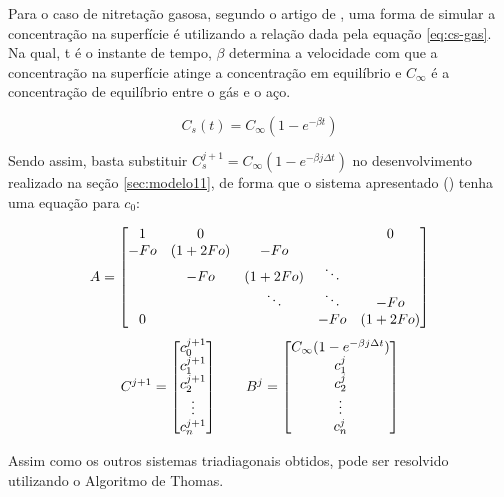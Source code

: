 Para o caso de nitretação gasosa, segundo o artigo de \cite{christiansen2008nitrogen}, uma forma de simular a concentração na superfície é utilizando a relação dada pela equação \autoref{eq:cs-gas}. Na qual, t é o instante de tempo, $\beta$ determina a velocidade com que a concentração na superfície atinge a concentração em equilíbrio e $C_{\infty}$ é a concentração de equilíbrio entre o gás e o aço.

\begin{equation}
\label{eq:cs-gas}
C_{s}(t) = C_{\infty}(1 - e^{-\beta t})
\end{equation}

Sendo assim, basta substituir $C_s^{j+1} = C_{\infty}(1 - e^{-\beta j\Delta t})$ no desenvolvimento realizado na seção \autoref{sec:modelo11}, de forma que o sistema apresentado () tenha uma equação para $c_0$:

\begin{equation*}
	\cmrtext{A} =
	\begin{bmatrix}
		  1 & 0 &         &        & 0\\
		-Fo & (1+2Fo) &  -Fo   &        & \\
		    & -Fo &   (1+2Fo)   & \ddots & \\
		    &     &  \ddots & \ddots & -Fo \\
	     0  &     &         &  -Fo   & (1+2Fo) 
	\end{bmatrix}
\end{equation*}
\begin{equation*}
	\cmrtext{C^{j+1}} =
	\begin{bmatrix}
		c_0^{j+1} \\
		c_1^{j+1} \\
		c_2^{j+1} \\
		\vdots \\
		c_n^{j+1}
	\end{bmatrix}
	\qquad
	\cmrtext{B^j} =	
	\begin{bmatrix}
		C_{\infty}(1 - e^{-\beta j\Delta t}) \\
		c_1^j \\
		c_2^{j} \\
		\vdots \\
		c_n^{j}
	\end{bmatrix}
\end{equation*}

Assim como os outros sistemas triadiagonais obtidos, pode ser resolvido utilizando o Algoritmo de Thomas.